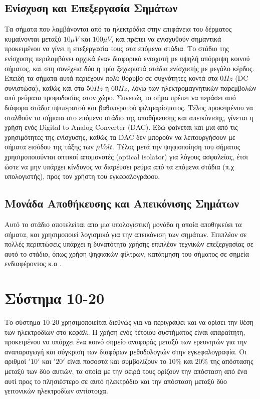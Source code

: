 \documentclass[11pt,a4paper,english,greek,twoside]{../Thesis}
\begin{document}
\subsection{Ενίσχυση και Επεξεργασία Σημάτων}
  Τα σήματα που λαμβάνονται από τα ηλεκτρόδια στην επιφάνεια του δέρματος κυμαίνονται μεταξύ $10μV$ και $100μV$, και πρέπει να ενισχυθούν σημαντικά προκειμένου να γίνει η επεξεργασία τους στα επόμενα στάδια. Το στάδιο της ενίσχυσης περιλαμβάνει αρχικά έναν διαφορικό ενισχυτή με υψηλή απόρριψη κοινού σήματος, και στη συνέχεια δύο η τρία ξεχωριστά στάδια ενίσχυσής με μεγάλο κέρδος. Επειδή τα σήματα αυτά περιέχουν πολύ θόρυβο σε συχνότητες κοντά στα $0Hz$ (DC συνιστώσα), καθώς και στα $50Hz$ η $60Hz$, λόγω των ηλεκτρομαγνητικών παρεμβολών από ρεύματα τροφοδοσίας στον χώρο. Συνεπώς το σήμα πρέπει να περάσει από διάφορα στάδια υψιπερατού και βαθυπερατού φιλτραρίσματος. Τέλος προκειμένου να σταλθούν τα σήματα στο επόμενο στάδιο της αποθήκευσης και απεικόνισης, γίνεται η χρήση ενός Digital to Analog Converter (DAC). Εδώ φαίνεται και μια από τις χρησιμότητες της ενίσχυσης, καθώς τα DAC δεν μπορούν να λειτουργήσουν με σήματα εισόδου της τάξης των $μVolt$. Τέλος μετά την ψηφιοποίηση του σήματος χρησιμοποιούνται οπτικοί απομονοτές (optical isolator) για λόγους ασφαλείας, έτσι ώστε να μην υπάρχει κίνδυνος να διαρέυσει ρεύμα από τα επόμενα στάδια (π.χ υπολογιστής), προς τον χρήστη του εγκεφαλογράφου.

\subsection{Μονάδα Αποθήκευσης και Απεικόνισης Σημάτων}
  Αυτό το στάδιο αποτελείται απο μια υπολογιστική μονάδα η οποία αποθηκεύει τα σήματα, και χρησιμοποιεί λογισμικό για την απεικόνιση των σημάτων. Επιπλέον σε πολλές περιπτώσεις υπάρχει η δυνατότητα χρήσης επιπλέον τεχνικών επεξεργασίας σε αυτό το στάδιο, όπως χρήση ψηφιακών φίλτρων, κατάτμηση του σήματος σε σημεία ενδιαφέροντος κ.α .

\section{Σύστημα 10-20}
Το σύστημα 10-20 χρησιμοποιείται διεθνώς για να περιγράψει και να ορίσει την θέση των ηλεκτροδίων στο κεφάλι. Η χρήση ενός τέτοιου συστήματος είναι απαραίτητη, προκειμένου να υπάρχει ένα κοινό σημείο αναφοράς μεταξύ των ερευνητών για την αναπαραγωγή και σύγκριση των διαφόρων μεθοδολογιών στην εγκεφαλογραφία.
Οι αριθμοί $'10'$ και $'20'$ είναι ποσοστά και συμβολίζουν το $10\% $ και $20\% $  της απόστασης μεταξύ των δύο αυτιών, τα οποία με την σειρά τους ορίζουν την απόσταση από ένα αυτί προς το πλησιέστερο σε αυτό ηλεκτρόδιο και την απόσταση μεταξύ δύο γειτονικών ηλεκτροδίων αντίστοιχα.
\end{document}
